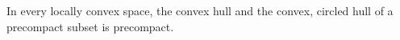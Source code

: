 In every locally convex space, the convex hull and the convex, circled hull of a precompact subset is precompact.
